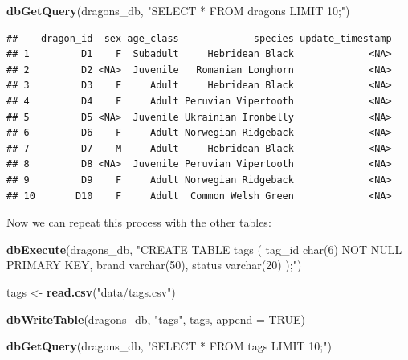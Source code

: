 \documentclass[
]{book}
\newenvironment{Shaded}{\begin{snugshade}}{\end{snugshade}}
\newcommand{\AttributeTok}[1]{\textcolor[rgb]{0.13,0.29,0.53}{#1}}
\newcommand{\ConstantTok}[1]{\textcolor[rgb]{0.56,0.35,0.01}{#1}}
\newcommand{\FunctionTok}[1]{\textcolor[rgb]{0.13,0.29,0.53}{\textbf{#1}}}
\newcommand{\NormalTok}[1]{#1}
\newcommand{\OtherTok}[1]{\textcolor[rgb]{0.56,0.35,0.01}{#1}}
\newcommand{\StringTok}[1]{\textcolor[rgb]{0.31,0.60,0.02}{#1}}
\begin{document}
\begin{Shaded}
\begin{Highlighting}[]
\FunctionTok{dbGetQuery}\NormalTok{(dragons\_db, }\StringTok{"SELECT * FROM dragons LIMIT 10;"}\NormalTok{)}
\end{Highlighting}
\end{Shaded}

\begin{verbatim}
##    dragon_id  sex age_class             species update_timestamp
## 1         D1    F  Subadult     Hebridean Black             <NA>
## 2         D2 <NA>  Juvenile   Romanian Longhorn             <NA>
## 3         D3    F     Adult     Hebridean Black             <NA>
## 4         D4    F     Adult Peruvian Vipertooth             <NA>
## 5         D5 <NA>  Juvenile Ukrainian Ironbelly             <NA>
## 6         D6    F     Adult Norwegian Ridgeback             <NA>
## 7         D7    M     Adult     Hebridean Black             <NA>
## 8         D8 <NA>  Juvenile Peruvian Vipertooth             <NA>
## 9         D9    F     Adult Norwegian Ridgeback             <NA>
## 10       D10    F     Adult  Common Welsh Green             <NA>
\end{verbatim}

Now we can repeat this process with the other tables:

\begin{Shaded}
\begin{Highlighting}[]
\FunctionTok{dbExecute}\NormalTok{(dragons\_db, }\StringTok{"CREATE TABLE tags (}
\StringTok{tag\_id char(6) NOT NULL PRIMARY KEY,}
\StringTok{brand varchar(50),}
\StringTok{status varchar(20)}
\StringTok{);"}\NormalTok{)}
\end{Highlighting}
\end{Shaded}

\begin{Shaded}
\begin{Highlighting}[]
\NormalTok{tags }\OtherTok{\textless{}{-}} \FunctionTok{read.csv}\NormalTok{(}\StringTok{"data/tags.csv"}\NormalTok{)}

\FunctionTok{dbWriteTable}\NormalTok{(dragons\_db, }\StringTok{"tags"}\NormalTok{, tags, }\AttributeTok{append =} \ConstantTok{TRUE}\NormalTok{)}
\end{Highlighting}
\end{Shaded}

\begin{Shaded}
\begin{Highlighting}[]
\FunctionTok{dbGetQuery}\NormalTok{(dragons\_db, }\StringTok{"SELECT * FROM tags LIMIT 10;"}\NormalTok{)}
\end{Highlighting}
\end{Shaded}
\end{document}
